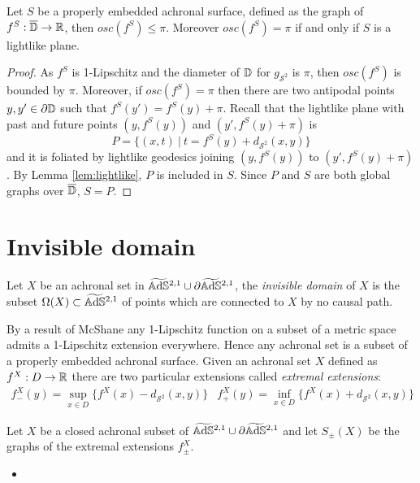 \begin{lemma}\label{lem:osc}
    Let $S$ be a properly embedded achronal surface, defined as the graph of $f^S:\overline{\mathbb{D}} \to \mathbb{R}$, then $osc(f^S) \leq \pi$. Moreover $osc(f^S)= \pi$ if and only if $S$ is a lightlike plane.
\end{lemma}
\begin{proof}
    As $f^S$ is 1-Lipschitz and the diameter of $\mathbb{D}$ for $g_{\mathcal{S}^2}$ is $\pi$, then $osc(f^S)$ is bounded by $\pi$. Moreover, if $osc(f^S)=\pi$ then there are two antipodal points $y,y'\in \partial \mathbb{D}$ such that $f^S(y')=f^S(y) + \pi$. Recall that the lightlike plane with past and future points $(y,f^S(y))$ and $(y',f^S(y)+\pi)$ is
    \[
        P = \{ (x,t) \ | \ t=f^S(y) + d_{\mathcal{S}^2}(x,y) \}
    \]
    and it is foliated by lightlike geodesics joining $(y,f^S(y))$ to $(y',f^S(y)+\pi)$. By Lemma \ref{lem:lightlike}, $P$ is included in $S$. Since $P$ and $S$ are both global graphs over $\overline{\mathbb{D}}$, $S=P$.
\end{proof}
    


\section{Invisible domain}
\begin{definition}
    Let $X$ be an achronal set in $\widetilde{\mathbb{A}\mathrm{d}\mathbb{S}}{}^{2,1} \cup \partial\widetilde{\mathbb{A}\mathrm{d}\mathbb{S}}{}^{2,1}$, the \textit{invisible domain} of $X$ is the subset $\Omega(X) \subset \widetilde{\mathbb{A}\mathrm{d}\mathbb{S}}{}^{2,1}$ of points which are connected to $X$ by no causal path.
\end{definition}
By a result of McShane \cite{mcshane1934extension} any 1-Lipschitz function on a subset of a metric space admits a 1-Lipschitz extension everywhere. Hence any achronal set is a subset of a properly embedded achronal surface.
Given an achronal set $X$ defined as $f^X : D \to \mathbb{R}$ there are two particular extensions called \textit{extremal extensions}:
\[
\begin{array}{cc}
    f_-^X(y)= \sup_{x\in D}\{ f^X(x)-d_{\mathcal{S}^2}(x,y) \} & f_+^X(y)= \inf_{x\in D}\{ f^X(x)+d_{\mathcal{S}^2}(x,y) \}
\end{array}
\]
\begin{lemma}\label{lem:extremal extension}
    Let $X$ be a closed achronal subset of $\widetilde{\mathbb{A}\mathrm{d}\mathbb{S}}{}^{2,1} \cup \partial\widetilde{\mathbb{A}\mathrm{d}\mathbb{S}}{}^{2,1}$ and let $S_\pm (X)$ be the graphs of the extremal extensions $f^X_\pm$.
    \begin{itemize}
        \item {}
    \end{itemize}
\end{lemma}

